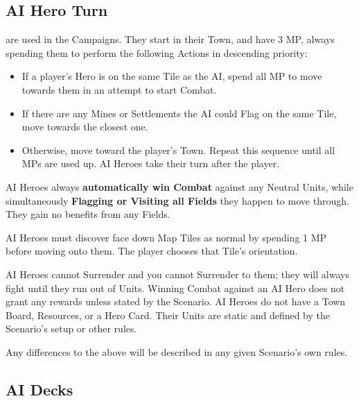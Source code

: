 
\begin{multicols}{2}

\subsection*{AI Hero Turn}
 are used in the Campaigns.
They start in their Town, and have 3 MP, always spending them to perform the following Actions in descending priority:
\begin{itemize}
  \item If a player's Hero is on the same Tile as the AI, spend all MP to move towards them in an attempt to start Combat.
  \item If there are any Mines or Settlements the AI could Flag on the same Tile, move towards the closest one.
  \item Otherwise, move toward the player's Town.
Repeat this sequence until all MPs are used up.
AI Heroes take their turn after the player.
\end{itemize}

AI Heroes always \textbf{automatically win Combat} against any Neutral Units, while simultaneously \textbf{Flagging or Visiting all Fields} they happen to move through.
They gain no benefits from any Fields.

AI Heroes must discover face down Map Tiles as normal by spending 1 MP before moving onto them.
The player chooses that Tile's orientation.\par
AI Heroes cannot Surrender and you cannot Surrender to them;
they will always fight until they run out of Units.
Winning Combat against an AI Hero does not grant any rewards unless stated by the Scenario.
AI Heroes do not have a Town Board, Resources, or a Hero Card.
Their Units are static and defined by the Scenario's setup or other rules.\par
Any differences to the above will be described in any given Scenario's own rules.

\vfill

\subsection*{AI Decks}


\end{multicols}
